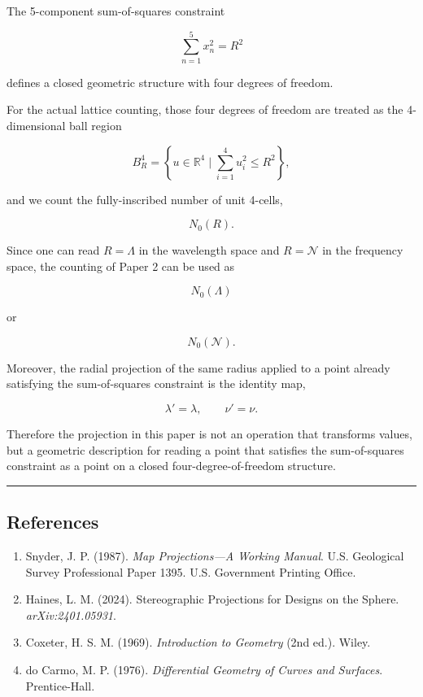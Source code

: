\documentclass[
]{article}
\begin{document}
The 5-component sum-of-squares constraint

\[
\sum_{n=1}^{5}x_n^2=R^2
\]

defines a closed geometric structure with four degrees of freedom.

For the actual lattice counting, those four degrees of freedom are
treated as the 4-dimensional ball region

\[
B^4_R
=
\left\{
u\in\mathbb{R}^4
\mid
\sum_{i=1}^{4}u_i^2\le R^2
\right\} ,
\]

and we count the fully-inscribed number of unit 4-cells,

\[
N_0(R) .
\]

Since one can read \(R=\Lambda\) in the wavelength space and
\(R=\mathcal{N}\) in the frequency space, the counting of Paper 2 can be
used as

\[
N_0(\Lambda)
\]

or

\[
N_0(\mathcal{N}) .
\]

Moreover, the radial projection of the same radius applied to a point
already satisfying the sum-of-squares constraint is the identity map,

\[
\lambda'=\lambda,\qquad
\nu'=\nu .
\]

Therefore the projection in this paper is not an operation that
transforms values, but a geometric description for reading a point that
satisfies the sum-of-squares constraint as a point on a closed
four-degree-of-freedom structure.

\begin{center}\rule{0.5\linewidth}{0.5pt}\end{center}

\subsection{References}\label{references}

\begin{enumerate}
\def\labelenumi{\arabic{enumi}.}
\item
  Snyder, J. P. (1987). \emph{Map Projections---A Working Manual}. U.S.
  Geological Survey Professional Paper 1395. U.S. Government Printing
  Office.
\item
  Haines, L. M. (2024). Stereographic Projections for Designs on the
  Sphere. \emph{arXiv:2401.05931}.
\item
  Coxeter, H. S. M. (1969). \emph{Introduction to Geometry} (2nd ed.).
  Wiley.
\item
  do Carmo, M. P. (1976). \emph{Differential Geometry of Curves and
  Surfaces}. Prentice-Hall.
\end{enumerate}
\end{document}
